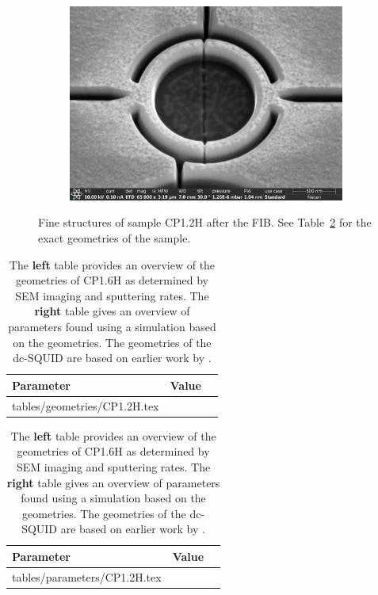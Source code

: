 \begin{figure}[ht!]
\begin{subfigure}[t]{0.3\textwidth}
		\centering
		\includegraphics[width=\textwidth]{figures/samples/CP1/CP1.2H_SEM_SQUID.jpg}
	\end{subfigure}

	\caption{Fine structures of sample CP1.2H after the FIB. See Table~\ref{tab:CP1.6H-geometries} for the exact geometries of the sample.}
	\label{fig:CP1.2H-SEM-images}
\end{figure}

\begin{table}
	\begin{subtable}{.6\linewidth}
		\begin{tabular}[t]{@{}lrr@{}}
			\toprule
			Parameter & Value \\ \midrule
			\expandableinput tables/geometries/CP1.2H.tex
			\bottomrule
		\end{tabular}
    \end{subtable}
    \hfill
    \begin{subtable}{.3\linewidth}
    	\flushright
    	\begin{tabular}[t]{@{}lrr@{}}
    		\toprule
    		Parameter & Value \\ \midrule
    		\expandableinput tables/parameters/CP1.2H.tex
    		\bottomrule
    	\end{tabular}
    \end{subtable}
    \caption{The \textbf{left} table provides an overview of the geometries of CP1.6H as determined by SEM imaging and sputtering rates. The \textbf{right} table gives an overview of parameters found using a simulation based on the geometries. The geometries of the dc-SQUID are based on earlier work by \citeauthor{rogSQUIDontipMagneticMicroscopy2022} \citeyear{rogSQUIDontipMagneticMicroscopy2022}.}
    \label{tab:CP1.6H-geometries}
\end{table}